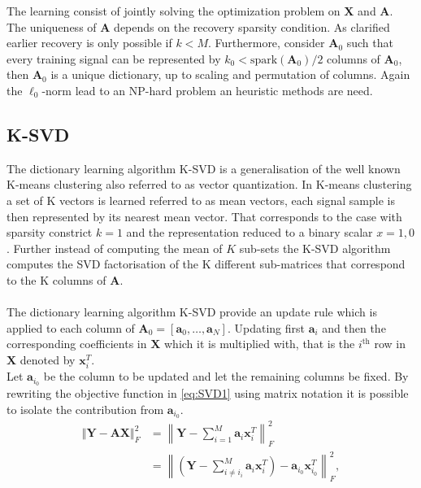 The learning consist of jointly solving the optimization problem on $\textbf{X}$ and $\textbf{A}$. The uniqueness of $\textbf{A}$ depends on the recovery sparsity condition. As clarified earlier recovery is only possible if $k < M$\cite{phd2015}. Furthermore, consider $\textbf{A}_0$ such that every training signal can be represented by $k_0 < \text{spark}(\textbf{A}_0)/2$ columns of $\textbf{A}_0$, then $\textbf{A}_0$ is a unique dictionary, up to scaling and permutation of columns\cite{Elad_book}. Again the $\ell_0$-norm lead to an NP-hard problem an heuristic methods are need.     

\subsection{K-SVD}
The dictionary learning algorithm K-SVD is a generalisation of the well known K-means clustering also referred to as vector quantization. In K-means clustering a set of K vectors is learned referred to as mean vectors, each signal sample is then represented by its nearest mean vector. That corresponds to the case with sparsity constrict $k=1$ and the representation reduced to a binary scalar $x={1,0}$. Further instead of computing the mean of $K$ sub-sets the K-SVD algorithm computes the SVD factorisation of the K different sub-matrices that correspond to the K columns of $\textbf{A}$.\\
\\
The dictionary learning algorithm K-SVD provide an update rule which is applied to each column of $\textbf{A}_0 = \left[ \textbf{a}_0, \hdots , \textbf{a}_N \right] $. Updating first $\textbf{a}_i$ and then the corresponding coefficients in $\textbf{X}$ which it is multiplied with, that is the $i^{\text{th}}$ row in $\textbf{X}$ denoted by $\textbf{x}_i^T$.\\
Let $\textbf{a}_{i_{0}}$ be the column to be updated and let the remaining columns be fixed. By rewriting the objective function in \eqref{eq:SVD1} using matrix notation it is possible to isolate the contribution from $\textbf{a}_{i_{0}}$.
\begin{align}
\Vert \textbf{Y} - \textbf{AX} \Vert_{F}^{2} 
&= \left\| \textbf{Y} - \sum_{i=1}^{M} \textbf{a}_i \textbf{x}_i^{T} \right\|_{F}^{2}\nonumber\\
&= \left\| \left( \textbf{Y}- \sum_{i\neq i_{i}}^{M} \textbf{a}_i\textbf{x}_i^{T}\right) - \textbf{a}_{i_{0}}\textbf{x}_{i_{0}}^{T} \right\| _{F}^{2},\label{eq:SVD2} 
\end{align}
